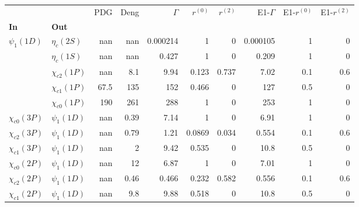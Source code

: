 \begin{tabular}{l|l|r|r|r|r|r|r|r|r}
\toprule
                &                &  PDG &  Deng &  $\Gamma$ &  $r^{(0)}$ &  $r^{(2)}$ &  E1-$\Gamma$ &  E1-$r^{(0)}$ &  E1-$r^{(2)}$ \\
\textbf{In} & \textbf{Out} &      &       &           &            &            &              &               &               \\
\midrule
\textbf{$\psi_{1}(1D)$} & \textbf{$\eta_{c}(2S)$} &  nan &   nan &  0.000214 &          1 &          0 &     0.000105 &             1 &             0 \\
                & \textbf{$\eta_{c}(1S)$} &  nan &   nan &     0.427 &          1 &          0 &        0.209 &             1 &             0 \\
                & \textbf{$\chi_{c2}(1P)$} &  nan &   8.1 &      9.94 &      0.123 &      0.737 &         7.02 &           0.1 &           0.6 \\
                & \textbf{$\chi_{c1}(1P)$} & 67.5 &   135 &       152 &      0.466 &          0 &          127 &           0.5 &             0 \\
                & \textbf{$\chi_{c0}(1P)$} &  190 &   261 &       288 &          1 &          0 &          253 &             1 &             0 \\
\textbf{$\chi_{c0}(3P)$} & \textbf{$\psi_{1}(1D)$} &  nan &  0.39 &      7.14 &          1 &          0 &         6.91 &             1 &             0 \\
\textbf{$\chi_{c2}(3P)$} & \textbf{$\psi_{1}(1D)$} &  nan &  0.79 &      1.21 &     0.0869 &      0.034 &        0.554 &           0.1 &           0.6 \\
\textbf{$\chi_{c1}(3P)$} & \textbf{$\psi_{1}(1D)$} &  nan &     2 &      9.42 &      0.535 &          0 &         10.8 &           0.5 &             0 \\
\textbf{$\chi_{c0}(2P)$} & \textbf{$\psi_{1}(1D)$} &  nan &    12 &      6.87 &          1 &          0 &         7.01 &             1 &             0 \\
\textbf{$\chi_{c2}(2P)$} & \textbf{$\psi_{1}(1D)$} &  nan &  0.46 &     0.466 &      0.232 &      0.582 &        0.556 &           0.1 &           0.6 \\
\textbf{$\chi_{c1}(2P)$} & \textbf{$\psi_{1}(1D)$} &  nan &   9.8 &      9.88 &      0.518 &          0 &         10.8 &           0.5 &             0 \\
\bottomrule
\end{tabular}

